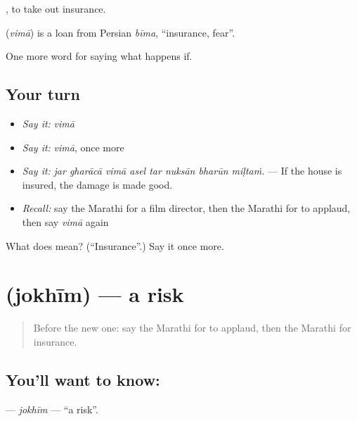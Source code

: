  , to take out insurance.

\begin{cousinweb}
\textbf{} (\emph{vimā}) is a loan from Persian \emph{bīma}, \textquotedblleft{}insurance, fear\textquotedblright{}.
\end{cousinweb}

\begin{grammarlens}[title={What you've built}]
One more word for saying what happens if.
\end{grammarlens}

\subsection*{Your turn}
\begin{itemize}
\raggedright
  \item \emph{Say it:} \emph{vimā}
  \item \emph{Say it:} \emph{vimā}, once more
  \item \emph{Say it:} \emph{jar gharācā vimā asel tar nuksān bharūn miḷtaṁ.} — If the house is insured, the damage is made good.
  \item \emph{Recall:} say the Marathi for a film director, then the Marathi for to applaud, then say \emph{vimā} again
\end{itemize}

\begin{tcolorbox}[breakable,colback=teal!4,colframe=teal!35!black,title={Before you move on}]
What does  mean? (\textquotedblleft{}Insurance\textquotedblright{}.) Say it once more.
\end{tcolorbox}
\section[\texorpdfstring{\mr{जोखीम} (jokhīm)}{जोखीम (jokhīm)}]{ (jokhīm) — a risk}

\label{lesson:MR-C540-jokhim}



\begin{quote}
Before the new one: say the Marathi for to applaud, then the Marathi for insurance.
\end{quote}

\subsection*{You'll want to know: }
\textbf{} — \emph{jokhīm} — \textquotedblleft{}a risk\textquotedblright{}.

